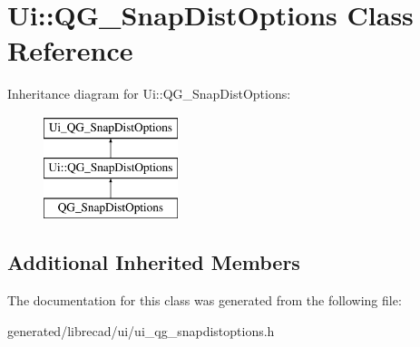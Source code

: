 \hypertarget{classUi_1_1QG__SnapDistOptions}{\section{Ui\-:\-:Q\-G\-\_\-\-Snap\-Dist\-Options Class Reference}
\label{classUi_1_1QG__SnapDistOptions}
}
Inheritance diagram for Ui\-:\-:Q\-G\-\_\-\-Snap\-Dist\-Options\-:\begin{figure}[H]
\begin{center}
\leavevmode
\includegraphics[height=3.000000cm]{classUi_1_1QG__SnapDistOptions}
\end{center}
\end{figure}
\subsection*{Additional Inherited Members}


The documentation for this class was generated from the following file\-:\begin{DoxyCompactItemize}
\item 
generated/librecad/ui/ui\-\_\-qg\-\_\-snapdistoptions.\-h\end{DoxyCompactItemize}
